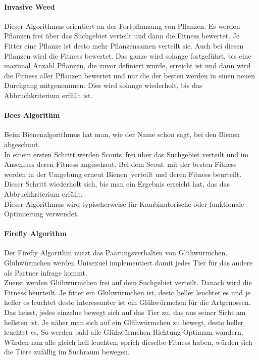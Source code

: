 		\paragraph{Invasive Weed}
		$\;$ \\
		Dieser Algorithmus orientiert an der Fortpflanzung von Pflanzen. Es werden Pflanzen frei über das Suchgebiet verteilt und dann die Fitness bewertet. Je Fitter eine Pflanze ist desto mehr Pflanzensamen verteilt sie. Auch bei diesen Pflanzen wird die Fitness bewertet. Das ganze wird solange fortgeführt, bis eine maximal Anzahl Pflanzen, die zuvor definiert wurde, erreicht ist und dann wird die Fitness aller Pflanzen bewertet und nur die der besten werden in einen neuen Durchgang mitgenommen. Dies wird solange wiederholt, bis das Abbruchkriterium erfüllt ist.
				
		
		\paragraph{Bees Algorithm}
		$\;$ \\
		Beim Bienenalgorithmus hat man, wie der Name schon sagt, bei den Bienen abgeschaut.\\
		In einem ersten Schritt werden \textacutedbl Scouts\textacutedbl \ frei über das Suchgebiet verteilt und im Anschluss deren Fitness angeschaut. Bei dem \textacutedbl Scout\textacutedbl \ mit der besten Fitness werden in der Umgebung erneut \textacutedbl Bienen\textacutedbl \ verteilt und deren Fitness beurteilt. Dieser Schritt wiederholt sich, bis man ein Ergebnis erreicht hat, das das Abbruchkriterium erfüllt.\\Dieser Algorithmus wird typischerweise für Kombinatorische oder funktionale Optimierung verwendet.
		
		\paragraph{Firefly Algorithm} 
		$\;$ \\
		Der Firefly Algorithm nutzt das Paarungsverhalten von Glühwürmchen. Glühwürmchen werden Unisexuel implementiert damit jedes Tier für das andere als Partner infrage kommt. \\
		Zuerst werden Glühwürmchen frei auf dem Suchgebiet verteilt. Danach wird die Fitness beurteilt. Je fitter ein Glühwürmchen ist, desto heller leuchtet es und je heller es leuchtet desto interessanter ist ein Glühwürmchen für die Artgenossen. Das heisst, jedes einzelne bewegt sich auf das Tier zu, das aus seiner Sicht am hellsten ist. Je näher man sich auf ein Glühwürmchen zu bewegt, desto heller leuchtet es. So werden bald alle Glühwürmchen Richtung Optimum wandern. Würden nun alle gleich hell leuchten, sprich dieselbe Fitness haben, würden sich die Tiere zufällig im Suchraum bewegen.
		
		